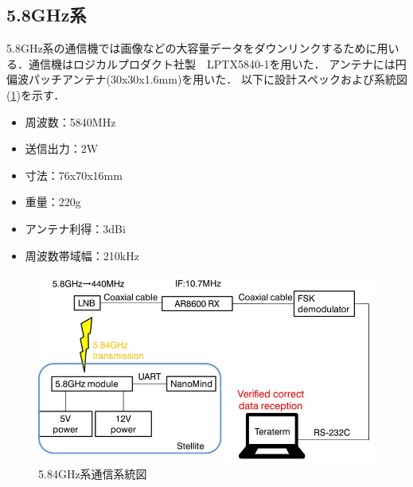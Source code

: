 \subsection{5.8GHz系}
5.8GHz系の通信機では画像などの大容量データをダウンリンクするために用いる．通信機はロジカルプロダクト社製　LPTX5840-1を用いた．
アンテナには円偏波パッチアンテナ(30x30x1.6mm)を用いた．
以下に設計スペックおよび系統図(\ref{fig4-2-4})を示す．
\begin{itemize}
	\item 周波数：5840MHz
	\item 送信出力：2W
	\item 寸法：76x70x16mm
	\item 重量：220g
	\item アンテナ利得：3dBi
	\item 周波数帯域幅：210kHz
\end{itemize}
\begin{figure}[H]
	\centering
	\includegraphics[scale=0.6]{03/fig/4-2-4.jpg}
	\caption{5.84GHz系通信系統図}
	\label{fig4-2-4}
\end{figure}

